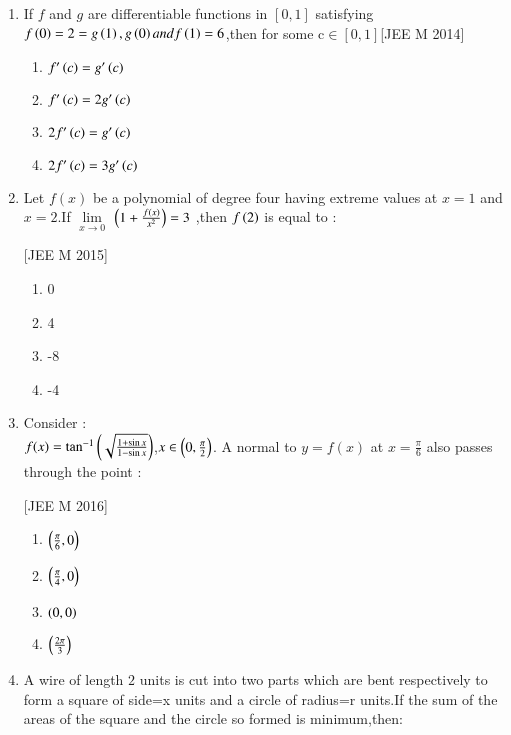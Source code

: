 \documentclass[journal,12pt,twocolumn]{IEEEtran}
\theoremstyle{remark}
\begin{document}
\begin{enumerate}
\begin{enumerate}
\end{enumerate}

\item If $f$ and $g$ are differentiable functions in ${[0,1]}$ satisfying $f\left(0\right)=2=g\left(1\right),g\left(0\right) and f\left(1\right)=6$,then for some c$\in {[0,1]}$\hfill[JEE M 2014]
\begin{enumerate}
    \item  $f'\left(c\right)=g'\left(c\right)$\\
    \item  $f'\left(c\right)=2g'\left(c\right)$\\
    \item  $2f'\left(c\right)=g'\left(c\right)$\\
    \item  $2f'\left(c\right)=3g'\left(c\right)$\\
\end{enumerate}
\item Let $f(x)$ be a polynomial of degree four having extreme values at $x=1$ and $x=2$.If $\lim\limits_{x\to 0}$ $\left(1+\frac{f(x)}{x^{2}}\right)=3$ ,then $f\left(2\right)$ is equal to :

    \hfill[JEE M 2015]\\
\begin{enumerate}
    \item  0\\
    \item  4\\
    \item -8\\
    \item -4\\
\end{enumerate}    
\item Consider $:$\\
     $f(x)=\tan^{-1}\left( \sqrt{\frac{1+\sin{x}}{1-\sin{x}} }\right)$,$x \in \left(0,\frac{\pi}{2}\right)$.
A normal to $y=f(x)$ at $x=\frac{\pi}{6}$ also passes through the point :

\hfill[JEE M 2016]\\
\begin{enumerate}
    \item  $\left(\frac{\pi}{6},0\right)$\\
    \item  $\left(\frac{\pi}{4},0\right)$\\
    \item  $\left(0,0\right)$\\
    \item  $\left(\frac{2\pi}{3}\right)$\\
\end{enumerate}
\item A wire of length $2$ units is cut into two parts which are bent respectively to form a square of side=x units and a circle of radius=r units.If the sum of the areas of the square and the circle so formed is minimum,then:


\end{enumerate}
\end{document}
